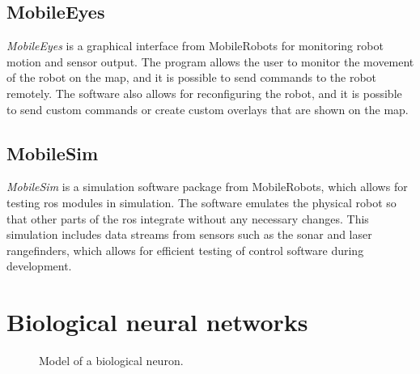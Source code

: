 \documentclass[\rootfolder/main.tex]{subfiles}
\begin{document}

\subsection{MobileEyes}

\emph{MobileEyes} is a graphical interface from MobileRobots for monitoring robot motion and sensor output.
The program allows the user to monitor the movement of the robot on the map, and it is possible to send commands to the robot remotely.
The software also allows for reconfiguring the robot, and it is possible to send custom commands or create custom overlays that are shown on the map.


\subsection{MobileSim}

\emph{MobileSim} is a simulation software package from MobileRobots, which allows for testing \acrshort{ros} modules in simulation.
The software emulates the physical robot so that other parts of the \acrshort{ros} integrate without any necessary changes.
This simulation includes data streams from sensors such as the sonar and laser rangefinders, which allows for efficient testing of control software during development.


\section{Biological neural networks}

\begin{figure}
    \caption{Model of a biological neuron.\label{fig:biological_neuron}}
\end{figure}

\end{document}
